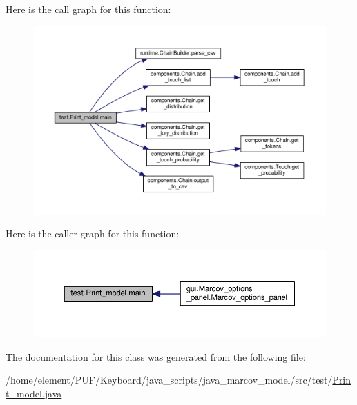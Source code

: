 Here is the call graph for this function\+:\nopagebreak
\begin{figure}[H]
\begin{center}
\leavevmode
\includegraphics[width=350pt]{classtest_1_1_print__model_a00a222f0a0350d0d6001a5b722485c1f_cgraph}
\end{center}
\end{figure}




Here is the caller graph for this function\+:\nopagebreak
\begin{figure}[H]
\begin{center}
\leavevmode
\includegraphics[width=350pt]{classtest_1_1_print__model_a00a222f0a0350d0d6001a5b722485c1f_icgraph}
\end{center}
\end{figure}




The documentation for this class was generated from the following file\+:\begin{DoxyCompactItemize}
\item 
/home/element/\+P\+U\+F/\+Keyboard/java\+\_\+scripts/java\+\_\+marcov\+\_\+model/src/test/\hyperlink{_print__model_8java}{Print\+\_\+model.\+java}\end{DoxyCompactItemize}

